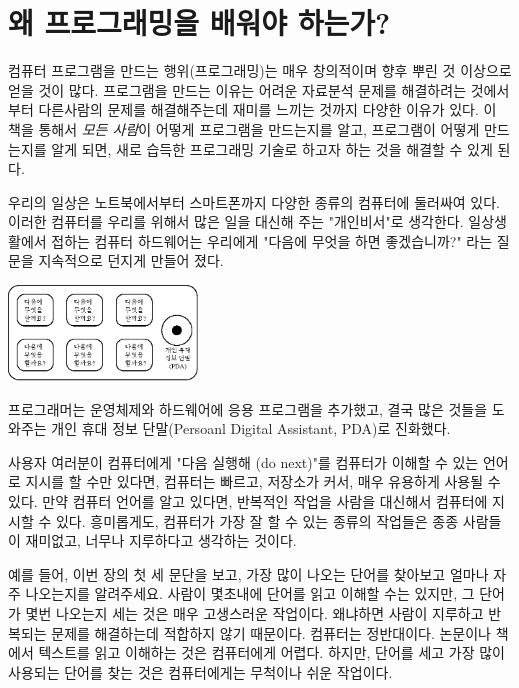 
\chapter{왜 프로그래밍을 배워야 하는가?}

컴퓨터 프로그램을 만드는 행위(프로그래밍)는 매우 창의적이며 향후 뿌린 것 이상으로 얻을 것이 많다. 
프로그램을 만드는 이유는 어려운 자료분석 문제를 해결하려는 것에서부터 다른사람의 문제를 해결해주는데 재미를 느끼는 것까지 다양한 이유가 있다. 
이 책을 통해서 \emph{모든 사람}이 어떻게 프로그램을 만드는지를 알고, 프로그램이 어떻게 만드는지를 알게 되면, 
새로 습득한 프로그래밍 기술로 하고자 하는 것을 해결할 수 있게 된다.

우리의 일상은 노트북에서부터 스마트폰까지 다양한 종류의 컴퓨터에 둘러싸여 있다. 
이러한 컴퓨터를 우리를 위해서 많은 일을 대신해 주는 "개인비서"로  생각한다. 
일상생활에서 접하는 컴퓨터 하드웨어는 우리에게 "다음에 무엇을 하면 좋겠습니까?" 라는 질문을 지속적으로 던지게 만들어 졌다.

\beforefig
\centerline{\includegraphics[height=1.00in]{figs2/pda.eps}}
\afterfig

프로그래머는 운영체제와 하드웨어에 응용 프로그램을 추가했고, 결국 많은 것들을 도와주는 개인 휴대 정보 단말(Persoanl Digital Assistant, PDA)로 진화했다. 

사용자 여러분이 컴퓨터에게 "다음 실행해 (do next)"를 컴퓨터가 이해할 수 있는 언어로 지시를 할 수만 있다면, 
컴퓨터는 빠르고, 저장소가 커서, 매우 유용하게 사용될 수 있다.
만약 컴퓨터 언어를 알고 있다면, 반복적인 작업을 사람을 대신해서 컴퓨터에 지시할 수 있다.
흥미롭게도, 컴퓨터가 가장 잘 할 수 있는 종류의 작업들은 종종 사람들이 재미없고, 너무나 지루하다고 생각하는 것이다. 

예를 들어, 이번 장의 첫 세 문단을 보고, 가장 많이 나오는 단어를 찾아보고 얼마나 자주 나오는지를 알려주세요. 
사람이 몇초내에 단어를 읽고 이해할 수는 있지만, 그 단어가 몇번 나오는지 세는 것은 매우 고생스러운 작업이다. 
왜냐하면 사람이 지루하고 반복되는 문제를 해결하는데 적합하지 않기 때문이다. 
컴퓨터는 정반대이다. 논문이나 책에서 텍스트를 읽고 이해하는 것은 컴퓨터에게 어렵다. 
하지만, 단어를 세고 가장 많이 사용되는 단어를 찾는 것은 컴퓨터에게는 무척이나 쉬운 작업이다.

